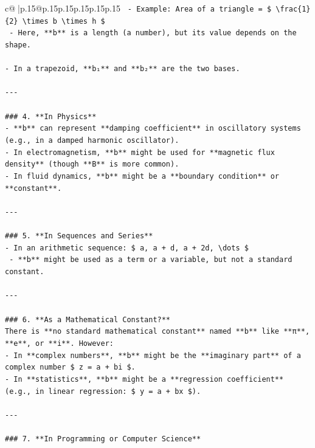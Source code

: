 \documentclass{article}
\begin{document}
{\begin{supertabular}{c@{$\;$}|p{.15\linewidth}@{}p{.15\linewidth}p{.15\linewidth}p{.15\linewidth}p{.15\linewidth}p{.15\linewidth}}
{{{\texttt{  {-} Example: Area of a triangle = \$ \textbackslash{}frac\{1\}\{2\} \textbackslash{}times b \textbackslash{}times h \$} \\
\texttt{  {-} Here, **b** is a length (a number), but its value depends on the shape.} \\
\\ 
\texttt{{-} In a trapezoid, **b₁** and **b₂** are the two bases.} \\
\\ 
\texttt{{-}{-}{-}} \\
\\ 
\texttt{\#\#\# 4. **In Physics**} \\
\texttt{{-} **b** can represent **damping coefficient** in oscillatory systems (e.g., in a damped harmonic oscillator).} \\
\texttt{{-} In electromagnetism, **b** might be used for **magnetic flux density** (though **B** is more common).} \\
\texttt{{-} In fluid dynamics, **b** might be a **boundary condition** or **constant**.} \\
\\ 
\texttt{{-}{-}{-}} \\
\\ 
\texttt{\#\#\# 5. **In Sequences and Series**} \\
\texttt{{-} In an arithmetic sequence: \$ a, a + d, a + 2d, \textbackslash{}dots \$} \\
\texttt{  {-} **b** might be used as a term or a variable, but not a standard constant.} \\
\\ 
\texttt{{-}{-}{-}} \\
\\ 
\texttt{\#\#\# 6. **As a Mathematical Constant?**} \\
\texttt{There is **no standard mathematical constant** named **b** like **π**, **e**, or **i**. However:} \\
\texttt{{-} In **complex numbers**, **b** might be the **imaginary part** of a complex number \$ z = a + bi \$.} \\
\texttt{{-} In **statistics**, **b** might be a **regression coefficient** (e.g., in linear regression: \$ y = a + bx \$).} \\
\\ 
\texttt{{-}{-}{-}} \\
\\ 
\texttt{\#\#\# 7. **In Programming or Computer Science**} \\
}}}
\end{supertabular}}
\end{document}

